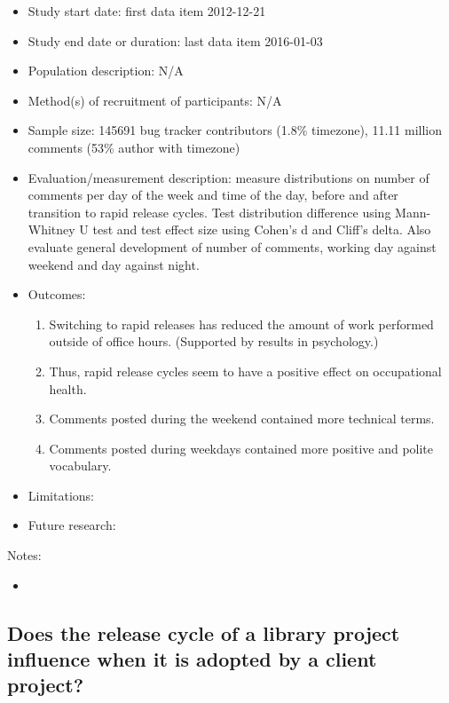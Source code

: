 \documentclass[]{book}
\providecommand{\tightlist}{%
  \setlength{\itemsep}{0pt}\setlength{\parskip}{0pt}}
\begin{document}
\begin{itemize}
\tightlist
\item
  Study start date: first data item 2012-12-21
\item
  Study end date or duration: last data item 2016-01-03
\item
  Population description: N/A
\item
  Method(s) of recruitment of participants: N/A
\item
  Sample size: 145691 bug tracker contributors (1.8\% timezone), 11.11
  million comments (53\% author with timezone)
\item
  Evaluation/measurement description: measure distributions on number of
  comments per day of the week and time of the day, before and after
  transition to rapid release cycles. Test distribution difference using
  Mann-Whitney U test and test effect size using Cohen's d and Cliff's
  delta. Also evaluate general development of number of comments,
  working day against weekend and day against night.
\item
  Outcomes:

  \begin{enumerate}
  \def\labelenumi{\arabic{enumi}.}
  \tightlist
  \item
    Switching to rapid releases has reduced the amount of work performed
    outside of office hours. (Supported by results in psychology.)
  \item
    Thus, rapid release cycles seem to have a positive effect on
    occupational health.
  \item
    Comments posted during the weekend contained more technical terms.
  \item
    Comments posted during weekdays contained more positive and polite
    vocabulary.
  \end{enumerate}
\item
  Limitations:
\item
  Future research:
\end{itemize}

Notes:

\begin{itemize}
\item
\end{itemize}

\subsection{Does the release cycle of a library project influence when
it is adopted by a client
project?}\label{does-the-release-cycle-of-a-library-project-influence-when-it-is-adopted-by-a-client-project}
\end{document}
